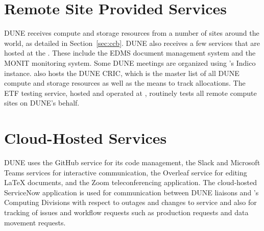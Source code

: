 \documentclass[../main-v1.tex]{subfiles}
\begin{document}
\section{Remote Site Provided Services}
DUNE receives compute and storage resources from a number of sites around the world, as detailed in %
Section~\ref{sec:ccb}. DUNE also receives a few services that are hosted at the .  These include the EDMS document
management system and the MONIT monitoring system. Some DUNE meetings are organized using 's Indico instance.   also hosts the DUNE CRIC, which is the master list of all DUNE compute and storage resources as well as the means to track allocations. The ETF testing service, hosted and operated at , routinely tests all remote compute sites on DUNE's behalf. %


\section{Cloud-Hosted Services}
DUNE uses the GitHub service for its code management, the Slack and Microsoft Teams services for interactive communication, the Overleaf service for editing \LaTeX{} documents, and the Zoom teleconferencing application.  The cloud-hosted ServiceNow application is used for communication between DUNE liaisons and %
's Computing Divisions with respect to outages and changes to service and also for %
tracking of issues and workflow requests such as production requests and data movement requests.
\end{document}
